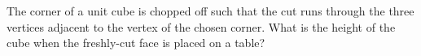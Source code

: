 The corner of a unit cube is chopped off such that the cut runs through the three vertices adjacent to the vertex of the chosen corner. What is the height of the cube when the freshly-cut face is placed on a table?